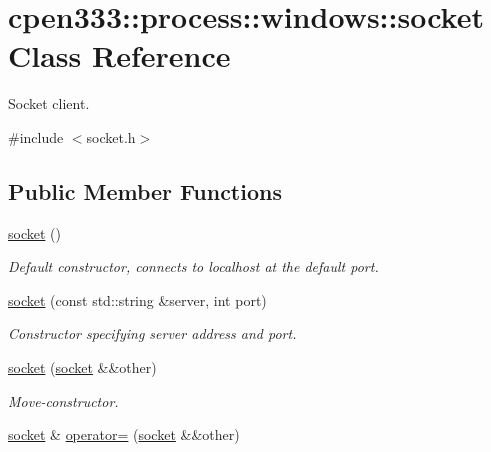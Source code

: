 \hypertarget{classcpen333_1_1process_1_1windows_1_1socket}{}\section{cpen333\+:\+:process\+:\+:windows\+:\+:socket Class Reference}
\label{classcpen333_1_1process_1_1windows_1_1socket}


Socket client.  




{\ttfamily \#include $<$socket.\+h$>$}

\subsection*{Public Member Functions}
\begin{DoxyCompactItemize}
\item 
\mbox{\label{classcpen333_1_1process_1_1windows_1_1socket_ac54e5fada84d95253f073f265666b98f}} 
\hyperlink{classcpen333_1_1process_1_1windows_1_1socket_ac54e5fada84d95253f073f265666b98f}{socket} ()
\begin{DoxyCompactList}\small\item\em Default constructor, connects to localhost at the default port. \end{DoxyCompactList}\item 
\hyperlink{classcpen333_1_1process_1_1windows_1_1socket_a51cd5207c99620a0a23e6d4b6684cacc}{socket} (const std\+::string \&server, int port)
\begin{DoxyCompactList}\small\item\em Constructor specifying server address and port. \end{DoxyCompactList}\item 
\hyperlink{classcpen333_1_1process_1_1windows_1_1socket_a5f52500d16f2c98de9ba0de9ec94224a}{socket} (\hyperlink{classcpen333_1_1process_1_1windows_1_1socket}{socket} \&\&other)
\begin{DoxyCompactList}\small\item\em Move-\/constructor. \end{DoxyCompactList}\item 
\hyperlink{classcpen333_1_1process_1_1windows_1_1socket}{socket} \& \hyperlink{classcpen333_1_1process_1_1windows_1_1socket_a7dadeabcad5dc6a98ead4d7053f9446c}{operator=} (\hyperlink{classcpen333_1_1process_1_1windows_1_1socket}{socket} \&\&other)

\end{DoxyCompactItemize}
